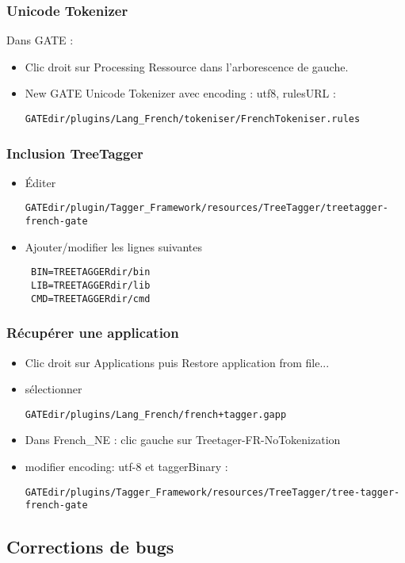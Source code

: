 \documentclass[a4paper, 10pt]{report}
\begin{document}
\subsubsection{Unicode Tokenizer}
Dans GATE :
\begin{itemize}
\item Clic droit sur Processing Ressource dans l'arborescence de gauche.
\item New  GATE Unicode Tokenizer avec encoding : utf8, rulesURL :\begin{verbatim}
GATEdir/plugins/Lang_French/tokeniser/FrenchTokeniser.rules
\end{verbatim}
\end{itemize}
\subsubsection{Inclusion TreeTagger}
\begin{itemize}
\item Éditer 
\begin{verbatim}
GATEdir/plugin/Tagger_Framework/resources/TreeTagger/treetagger-french-gate
\end{verbatim}
\item Ajouter/modifier les lignes suivantes 
\begin{verbatim}
 BIN=TREETAGGERdir/bin
 LIB=TREETAGGERdir/lib
 CMD=TREETAGGERdir/cmd
\end{verbatim}
\end{itemize}
\subsubsection{Récupérer une application}
\begin{itemize}
\item Clic droit sur Applications puis Restore application from file...
\item sélectionner \begin{verbatim}
GATEdir/plugins/Lang_French/french+tagger.gapp
\end{verbatim}
\item Dans French\_NE : clic gauche sur Treetager-FR-NoTokenization
\item modifier encoding: utf-8 et taggerBinary : \begin{verbatim}
GATEdir/plugins/Tagger_Framework/resources/TreeTagger/tree-tagger-french-gate
\end{verbatim}
\end{itemize}
\subsection{Corrections de bugs}
\end{document}
